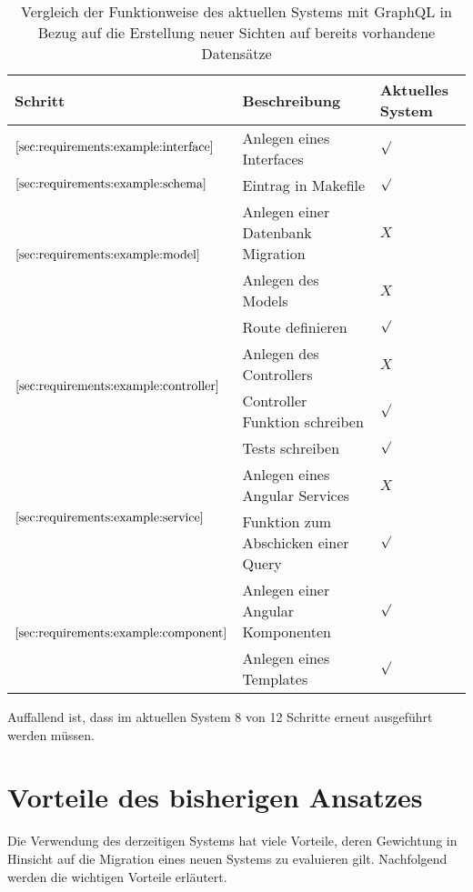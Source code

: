 \begin{table}[h!]
    \begin{tabular}{|p{}|p{}|p{}|}
        \hline
        \textbf{Schritt} & \textbf{Beschreibung} & \textbf{Aktuelles \newline System} \\ \hline
        $\ref{sec:requirements:example:interface}$ & Anlegen eines Interfaces & $\surd$  \\ \hline
        $\ref{sec:requirements:example:schema}$ & Eintrag in Makefile & $\surd$\\ \hline
        \multirow{2}{*}{$\ref{sec:requirements:example:model}$}
        & Anlegen einer Datenbank Migration & $X$  \\
        & Anlegen des Models & $X$ \\ \hline
        \multirow{4}{*}{$\ref{sec:requirements:example:controller}$}
        & Route definieren & $\surd$  \\
        & Anlegen des Controllers & $X$  \\
        & Controller Funktion schreiben & $\surd$  \\
        & Tests schreiben & $\surd$  \\ \hline
        \multirow{2}{*}{$\ref{sec:requirements:example:service}$}
        & Anlegen eines Angular Services & $X$  \\
        & Funktion zum Abschicken einer Query & $\surd$  \\ \hline
        \multirow{2}{*}{$\ref{sec:requirements:example:component}$}
        & Anlegen einer Angular Komponenten & $\surd$  \\
        & Anlegen eines Templates & $\surd$  \\ \hline
    \end{tabular}
    \vspace{5pt}
    \centering
    \caption{Vergleich der Funktionweise des aktuellen Systems mit GraphQL in Bezug auf die Erstellung neuer Sichten auf bereits vorhandene Datensätze}
    \label{tbl:newview}
\end{table}

Auffallend ist, dass im aktuellen System 8 von 12 Schritte erneut ausgeführt werden müssen.

\section{Vorteile des bisherigen Ansatzes}
\label{sec:requirements:pros}
Die Verwendung des derzeitigen Systems hat viele Vorteile,
deren Gewichtung in Hinsicht auf die Migration eines neuen Systems zu evaluieren gilt.
Nachfolgend werden die wichtigen Vorteile erläutert.

